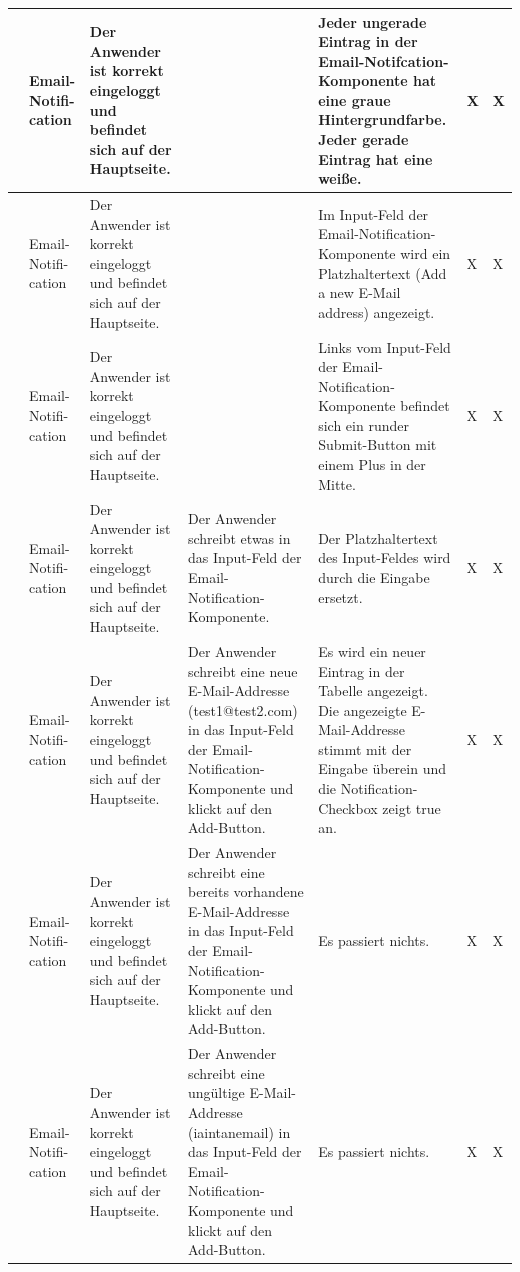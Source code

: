 \begin{longtable}{| p{} | p{} | p{} | p{} | p{} | p{} | p{} |}
	\stepcounter{TestNumber}\arabic{TestNumber} & Email-Notifi-cation & Der Anwender ist korrekt eingeloggt und befindet sich auf der Hauptseite. & & Jeder ungerade Eintrag in der Email-Notifcation-Komponente hat eine graue Hintergrundfarbe. Jeder gerade Eintrag hat eine weiße.  & X & X \\ \hline
	
	\stepcounter{TestNumber}\arabic{TestNumber} & Email-Notifi-cation & Der Anwender ist korrekt eingeloggt und befindet sich auf der Hauptseite. & & Im Input-Feld der Email-Notification-Komponente wird ein Platzhaltertext (Add a new E-Mail address) angezeigt. & X & X \\ \hline
	
	\stepcounter{TestNumber}\arabic{TestNumber} & Email-Notifi-cation & Der Anwender ist korrekt eingeloggt und befindet sich auf der Hauptseite. & & Links vom Input-Feld der Email-Notification-Komponente befindet sich ein runder Submit-Button mit einem Plus in der Mitte. & X & X \\ \hline
	
	\stepcounter{TestNumber}\arabic{TestNumber} & Email-Notifi-cation & Der Anwender ist korrekt eingeloggt und befindet sich auf der Hauptseite. & Der Anwender schreibt etwas in das Input-Feld der Email-Notification-Komponente. & Der Platzhaltertext des Input-Feldes wird durch die Eingabe ersetzt. & X & X \\ \hline
	
	\stepcounter{TestNumber}\arabic{TestNumber} & Email-Notifi-cation & Der Anwender ist korrekt eingeloggt und befindet sich auf der Hauptseite. & Der Anwender schreibt eine neue E-Mail-Addresse (test1@test2.com) in das Input-Feld der Email-Notification-Komponente und klickt auf den Add-Button. & Es wird ein neuer Eintrag in der Tabelle angezeigt. Die angezeigte E-Mail-Addresse stimmt mit der Eingabe überein und die Notification-Checkbox zeigt true an. & X & X \\ \hline
	
	\stepcounter{TestNumber}\arabic{TestNumber} & Email-Notifi-cation & Der Anwender ist korrekt eingeloggt und befindet sich auf der Hauptseite. & Der Anwender schreibt eine bereits vorhandene E-Mail-Addresse in das Input-Feld der Email-Notification-Komponente und klickt auf den Add-Button. & Es passiert nichts. & X & X \\ \hline
	
	\stepcounter{TestNumber}\arabic{TestNumber} & Email-Notifi-cation & Der Anwender ist korrekt eingeloggt und befindet sich auf der Hauptseite. & Der Anwender schreibt eine ungültige E-Mail-Addresse (iaintanemail) in das Input-Feld der Email-Notification-Komponente und klickt auf den Add-Button. & Es passiert nichts. & X & X \\ \hline
	

\end{longtable}
